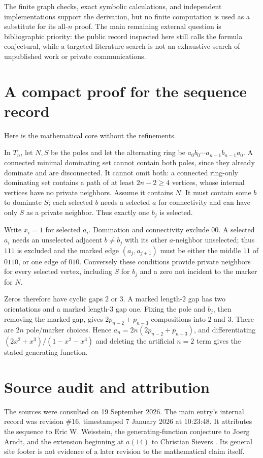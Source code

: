 \documentclass[11pt,letterpaper]{article}
\numberwithin{equation}{section}
\theoremstyle{definition}
\newcommand{\1}{\mathbf 1}
\begin{document}
The finite graph checks, exact symbolic calculations, and independent
implementations support the derivation, but no finite computation is used as
a substitute for its all-$n$ proof. The main remaining external question is
bibliographic priority: the public record inspected here still calls the
formula conjectural, while a targeted literature search is not an exhaustive
search of unpublished work or private communications.

\appendix
\section{A compact proof for the sequence record}\label{app:compact}
Here is the mathematical core without the refinements.

In $T_n$, let $N,S$ be the poles and let the alternating ring be
$a_0b_0\cdots a_{n-1}b_{n-1}a_0$. A connected minimal dominating set cannot
contain both poles, since they already dominate and are disconnected. It
cannot omit both: a connected ring-only dominating set contains a path of at
least $2n-2\ge4$ vertices, whose internal vertices have no private neighbors.
Assume it contains $N$. It must contain some $b$ to dominate $S$; each selected
$b$ needs a selected $a$ for connectivity and can have only $S$ as a private
neighbor. Thus exactly one $b_j$ is selected.

Write $x_i=1$ for selected $a_i$. Domination and connectivity exclude $00$.
A selected $a_i$ needs an unselected adjacent $b\ne b_j$ with its other
$a$-neighbor unselected; thus $111$ is excluded and the marked edge
$(a_j,a_{j+1})$ must be either the middle $11$ of $0110$, or one edge of $010$.
Conversely these conditions provide private neighbors for every selected
vertex, including $S$ for $b_j$ and a zero not incident to the marker for $N$.

Zeros therefore have cyclic gaps $2$ or $3$. A marked length-$2$ gap has two
orientations and a marked length-$3$ gap one. Fixing the pole and $b_j$, then
removing the marked gap, gives $2p_{n-2}+p_{n-3}$ compositions into $2$ and $3$.
There are $2n$ pole/marker choices. Hence
$a_n=2n(2p_{n-2}+p_{n-3})$, and differentiating
$(2x^2+x^3)/(1-x^2-x^3)$ and deleting the artificial $n=2$ term gives the stated
generating function.

\section{Source audit and attribution}\label{app:sources}
The sources were consulted on 19 September 2026. The main entry's internal
record was revision \#16, timestamped 7 January 2026 at 10:23:48. It attributes
the sequence to Eric W. Weisstein, the generating-function conjecture to Joerg
Arndt, and the extension beginning at $a(14)$ to Christian Sievers
\cite{A381190}. Its general site footer is not evidence of a later revision
to the mathematical claim itself.
\end{document}
